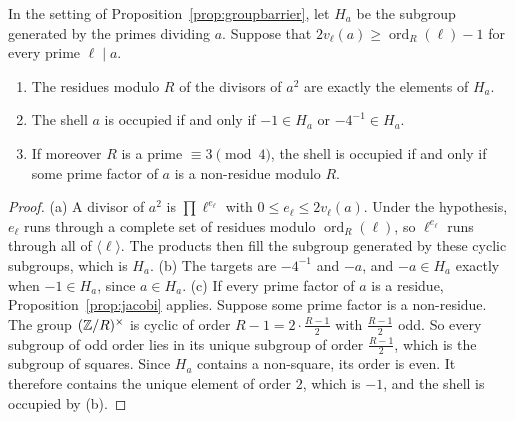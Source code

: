 \begin{proposition}\label{prop:groupconverse}
In the setting of Proposition~\ref{prop:groupbarrier}, let $H_a$ be the subgroup generated by the primes dividing $a$. Suppose that $2v_\ell(a)\ge\operatorname{ord}_R(\ell)-1$ for every prime $\ell\mid a$.
\begin{enumerate}[label=(\alph*)]
\item The residues modulo $R$ of the divisors of $a^2$ are exactly the elements of $H_a$.
\item The shell $a$ is occupied if and only if $-1\in H_a$ or $-4^{-1}\in H_a$.
\item If moreover $R$ is a prime $\equiv3\pmod4$, the shell is occupied if and only if some prime factor of $a$ is a non-residue modulo $R$.
\end{enumerate}
\end{proposition}
\begin{proof}
(a) A divisor of $a^2$ is $\prod\ell^{e_\ell}$ with $0\le e_\ell\le2v_\ell(a)$. Under the hypothesis, $e_\ell$ runs through a complete set of residues modulo $\operatorname{ord}_R(\ell)$, so $\ell^{e_\ell}$ runs through all of $\langle\ell\rangle$. The products then fill the subgroup generated by these cyclic subgroups, which is $H_a$.
(b) The targets are $-4^{-1}$ and $-a$, and $-a\in H_a$ exactly when $-1\in H_a$, since $a\in H_a$.
(c) If every prime factor of $a$ is a residue, Proposition~\ref{prop:jacobi} applies. Suppose some prime factor is a non-residue. The group $(\mathbb{Z}/R)^\times$ is cyclic of order $R-1=2\cdot\frac{R-1}2$ with $\frac{R-1}2$ odd. So every subgroup of odd order lies in its unique subgroup of order $\frac{R-1}2$, which is the subgroup of squares. Since $H_a$ contains a non-square, its order is even. It therefore contains the unique element of order $2$, which is $-1$, and the shell is occupied by (b).
\end{proof}
